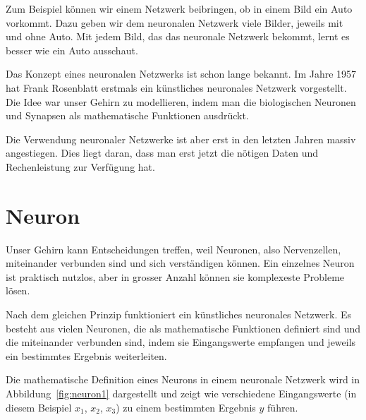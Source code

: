 \documentclass[12pt,a4paper]{report}
\begin{document}
Zum Beispiel können wir einem Netzwerk beibringen, ob in einem Bild ein Auto vorkommt.
Dazu geben wir dem neuronalen Netzwerk viele Bilder, jeweils mit und ohne Auto.
Mit jedem Bild, das das neuronale Netzwerk bekommt, lernt es besser wie ein Auto ausschaut.

Das Konzept eines neuronalen Netzwerks ist schon lange bekannt.
Im Jahre 1957 hat Frank Rosenblatt erstmals ein künstliches neuronales Netzwerk vorgestellt.
Die Idee war unser Gehirn zu modellieren,
indem man die biologischen Neuronen und Synapsen als mathematische Funktionen ausdrückt.

Die Verwendung neuronaler Netzwerke ist aber erst in den letzten Jahren massiv angestiegen.
Dies liegt daran, dass man erst jetzt die nötigen Daten
und Rechenleistung zur Verfügung hat.

\section{Neuron}\label{sec:neuron}
Unser Gehirn kann Entscheidungen treffen, weil Neuronen, also Nervenzellen,  miteinander verbunden sind und sich
verständigen können.
Ein einzelnes Neuron ist praktisch nutzlos, aber in grosser Anzahl können sie komplexeste Probleme lösen.

Nach dem gleichen Prinzip funktioniert ein künstliches neuronales Netzwerk.
Es besteht aus vielen Neuronen, die als mathematische Funktionen definiert sind und die miteinander verbunden sind,
indem sie Eingangswerte empfangen und jeweils ein bestimmtes Ergebnis weiterleiten.

Die mathematische Definition eines Neurons in einem neuronale Netzwerk wird in Abbildung~\ref{fig:neuron1} dargestellt
und zeigt wie verschiedene Eingangswerte (in diesem Beispiel $x_1$, $x_2$, $x_3$) zu einem bestimmten Ergebnis $y$ führen.
\end{document}
